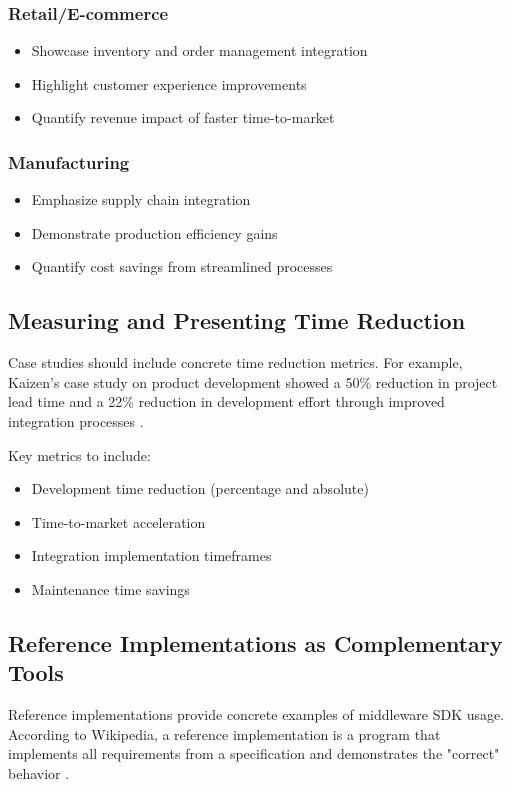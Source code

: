 \documentclass[11pt,a4paper]{article}
\begin{document}
\subsubsection{Retail/E-commerce}
\begin{itemize}
    \item Showcase inventory and order management integration
    \item Highlight customer experience improvements
    \item Quantify revenue impact of faster time-to-market
\end{itemize}

\subsubsection{Manufacturing}
\begin{itemize}
    \item Emphasize supply chain integration
    \item Demonstrate production efficiency gains
    \item Quantify cost savings from streamlined processes
\end{itemize}

\subsection{Measuring and Presenting Time Reduction}

Case studies should include concrete time reduction metrics. For example, Kaizen's case study on product development showed a 50\% reduction in project lead time and a 22\% reduction in development effort through improved integration processes \cite{kaizen2023}.

Key metrics to include:
\begin{itemize}
    \item Development time reduction (percentage and absolute)
    \item Time-to-market acceleration
    \item Integration implementation timeframes
    \item Maintenance time savings
\end{itemize}

\subsection{Reference Implementations as Complementary Tools}

Reference implementations provide concrete examples of middleware SDK usage. According to Wikipedia, a reference implementation is a program that implements all requirements from a specification and demonstrates the "correct" behavior \cite{wikipedia2023}.
\end{document}
